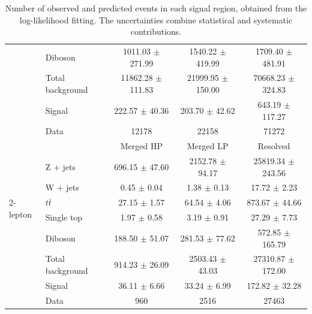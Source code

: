 \begin{table}[htbp]
\begin{center}
\begin{tabular}{| l | l | c | c | c |}
                   & Diboson      &  1011.03 $\pm$ 271.99          &   1540.22 $\pm$ 419.99         & 1709.40 $\pm$ 481.91\\ \cline{2-5}
                   & Total background    & 11862.28 $\pm$ 111.83            &   21999.95 $\pm$ 150.00         & 70668.23 $\pm$ 324.83\\ \cline{2-5}
                   & Signal       & 222.57 $\pm$ 40.36           & 203.70 $\pm$ 42.62           &643.19 $\pm$ 117.27\\ \cline{2-5}
                   & Data         & 12178           & 22158           &71272\\ \hline \hline
\multirow{7}{*}{2-lepton} &     & Merged HP  & Merged LP               & Resolved  \\ \cline{2-5}
        & Z + jets    &  696.15 $\pm$ 47.60  & 2152.78 $\pm$ 94.17     & 25819.34 $\pm$ 243.56\\ 
        & W + jets    &  0.45 $\pm$ 0.04     & 1.38 $\pm$ 0.13         & 17.72 $\pm$ 2.23\\  
        & $t\bar{t}$  &  27.15 $\pm$ 1.57    & 64.54 $\pm$ 4.06        & 873.67 $\pm$ 44.66\\ 
        & Single top        &  1.97 $\pm$ 0.58     & 3.19 $\pm$ 0.91         & 27.29 $\pm$ 7.73\\ 
        & Diboson     &  188.50 $\pm$ 51.07  & 281.53 $\pm$ 77.62      & 572.85 $\pm$ 165.79\\ \cline{2-5}
        & Total background   &  914.23 $\pm$ 26.09  & 2503.43 $\pm$ 43.03  & 27310.87 $\pm$ 172.00\\ \cline{2-5}
        & Signal      &  36.11 $\pm$ 6.66    & 33.24 $\pm$ 6.99        & 172.82 $\pm$ 32.28\\ \cline{2-5}
        & Data        &  960                 & 2516                    & 27463\\ \hline 
\end{tabular}
\caption{\label{tab:postyields} Number of observed and predicted events in each signal region, obtained from the log-likelihood fitting. The uncertainties combine statistical and systematic contributions. }
\end{center}
\end{table}

